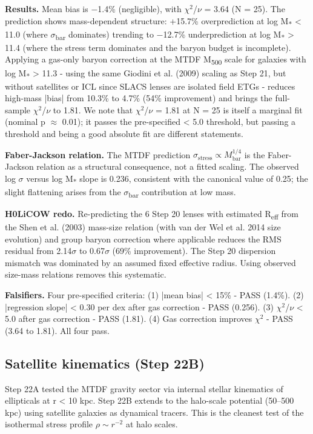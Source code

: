 \documentclass[11pt,a4paper]{article}
\begin{document}
\textbf{Results.} Mean bias is $-$1.4\% (negligible), with $\chi$$^{2}$/$\nu$ = 3.64 (N = 25). The prediction shows mass-dependent structure: +15.7\% overprediction at log M\textsubscript{*} < 11.0 (where $\sigma$\textsubscript{bar} dominates) trending to $-$12.7\% underprediction at log M\textsubscript{*} > 11.4 (where the stress term dominates and the baryon budget is incomplete). Applying a gas-only baryon correction at the MTDF M\textsubscript{500} scale for galaxies with log M\textsubscript{*} > 11.3  -  using the same Giodini et al. (2009) scaling as Step 21, but without satellites or ICL since SLACS lenses are isolated field ETGs  -  reduces high-mass |bias| from 10.3\% to 4.7\% (54\% improvement) and brings the full-sample $\chi$$^{2}$/$\nu$ to 1.81. We note that $\chi$$^{2}$/$\nu$ = 1.81 at N = 25 is itself a marginal fit (nominal p $\approx$ 0.01); it passes the pre-specified < 5.0 threshold, but passing a threshold and being a good absolute fit are different statements.

\textbf{Faber-Jackson relation.} The MTDF prediction \(\sigma_{\mathrm{stress}} \propto M_{\mathrm{bar}}^{1/4}\) is the Faber-Jackson relation as a structural consequence, not a fitted scaling. The observed log $\sigma$ versus log M\textsubscript{*} slope is 0.236, consistent with the canonical value of 0.25; the slight flattening arises from the $\sigma$\textsubscript{bar} contribution at low mass.

\textbf{H0LiCOW redo.} Re-predicting the 6 Step 20 lenses with estimated R\textsubscript{eff} from the Shen et al. (2003) mass-size relation (with van der Wel et al. 2014 size evolution) and group baryon correction where applicable reduces the RMS residual from 2.14$\sigma$ to 0.67$\sigma$ (69\% improvement). The Step 20 dispersion mismatch was dominated by an assumed fixed effective radius. Using observed size-mass relations removes this systematic.

\textbf{Falsifiers.} Four pre-specified criteria: (1) |mean bias| < 15\%  -  PASS (1.4\%). (2) |regression slope| < 0.30 per dex after gas correction  -  PASS (0.256). (3) $\chi$$^{2}$/$\nu$ < 5.0 after gas correction  -  PASS (1.81). (4) Gas correction improves $\chi$$^{2}$  -  PASS (3.64 to 1.81). All four pass.

\subsection{Satellite kinematics (Step 22B)}
Step 22A tested the MTDF gravity sector via internal stellar kinematics of ellipticals at r < 10 kpc. Step 22B extends to the halo-scale potential (50--500 kpc) using satellite galaxies as dynamical tracers. This is the cleanest test of the isothermal stress profile \(\rho \sim r^{-2}\) at halo scales.
\end{document}
